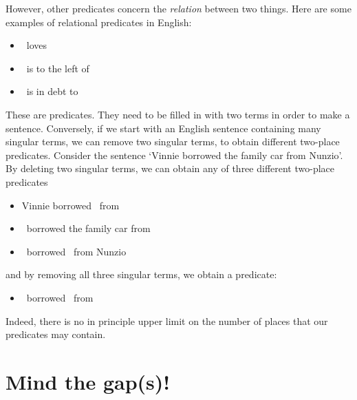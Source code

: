 However, other predicates concern the \emph{relation} between two things. Here are some examples of relational predicates in English:
	\begin{itemize}
		\item \blank\ loves \blank
		\item \blank\ is to the left of \blank
		\item \blank\ is in debt to \blank
	\end{itemize}
These are  predicates. They need to be filled in with two terms in order to make a sentence. Conversely, if we start with an English sentence containing many singular terms, we can remove two singular terms, to obtain different two-place predicates. Consider the sentence `Vinnie borrowed the family car from Nunzio'. By deleting two singular terms, we can obtain any of three different two-place predicates
	\begin{itemize}
		\item Vinnie borrowed \blank\ from \blank
		\item \blank\ borrowed the family car from \blank
		\item \blank\ borrowed \blank\ from Nunzio
	\end{itemize}
and by removing all three singular terms, we  obtain a  predicate:
	\begin{itemize}
		\item \blank\ borrowed \blank\ from \blank
	\end{itemize}
Indeed, there is no in principle upper limit on the number of places that our predicates may contain.

\section{Mind the gap(s)!}

